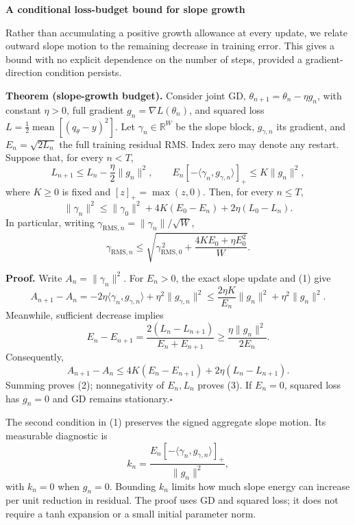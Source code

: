 \documentclass[10pt,letterpaper]{article}
\begin{document}
\fontsize{9.5}{10.6}\selectfont
{\large\bfseries A conditional loss-budget bound for slope growth\par}
\vspace{4pt}
Rather than accumulating a positive growth allowance at every update, we relate outward slope motion to the remaining decrease in training error. This gives a bound with no explicit dependence on the number of steps, provided a gradient-direction condition persists.

\textbf{Theorem (slope-growth budget).}
Consider joint GD, $\theta_{n+1}=\theta_n-\eta g_n$, with constant $\eta>0$, full gradient $g_n=\nabla L(\theta_n)$, and squared loss $L=\tfrac12\operatorname{mean}[(q_\theta-y)^2]$. Let $\gamma_n\in\mathbb R^W$ be the slope block, $g_{\gamma,n}$ its gradient, and $E_n=\sqrt{2L_n}$ the full training residual RMS. Index zero may denote any restart. Suppose that, for every $n<T$,
\begin{equation}
L_{n+1}\le L_n-\frac{\eta}{2}\|g_n\|^2,
\qquad
E_n[-\langle\gamma_n,g_{\gamma,n}\rangle]_+
\le K\|g_n\|^2,
\end{equation}
where $K\ge0$ is fixed and $[z]_+=\max(z,0)$. Then, for every $n\le T$,
\begin{equation}
\|\gamma_n\|^2
\le\|\gamma_0\|^2+4K(E_0-E_n)+2\eta(L_0-L_n).
\end{equation}
In particular, writing $\gamma_{\mathrm{RMS},n}=\|\gamma_n\|/\sqrt W$,
\begin{equation}
\boxed{
\gamma_{\mathrm{RMS},n}
\le\sqrt{\gamma_{\mathrm{RMS},0}^{\,2}+
\frac{4KE_0+\eta E_0^2}{W}}.
}
\end{equation}

\textbf{Proof.}
Write $A_n=\|\gamma_n\|^2$. For $E_n>0$, the exact slope update and (1) give
\[
A_{n+1}-A_n
=-2\eta\langle\gamma_n,g_{\gamma,n}\rangle
+\eta^2\|g_{\gamma,n}\|^2
\le\frac{2\eta K}{E_n}\|g_n\|^2+\eta^2\|g_n\|^2.
\]
Meanwhile, sufficient decrease implies
\[
E_n-E_{n+1}
=\frac{2(L_n-L_{n+1})}{E_n+E_{n+1}}
\ge\frac{\eta\|g_n\|^2}{2E_n}.
\]
Consequently,
\[
A_{n+1}-A_n
\le4K(E_n-E_{n+1})+2\eta(L_n-L_{n+1}).
\]
Summing proves (2); nonnegativity of $E_n,L_n$ proves (3). If $E_n=0$, squared loss has $g_n=0$ and GD remains stationary.\nobreak\hfill$\square$

The second condition in (1) preserves the signed aggregate slope motion. Its measurable diagnostic is
\[
k_n=\frac{E_n[-\langle\gamma_n,g_{\gamma,n}\rangle]_+}{\|g_n\|^2},
\]
with $k_n=0$ when $g_n=0$. Bounding $k_n$ limits how much slope energy can increase per unit reduction in residual. The proof uses GD and squared loss; it does not require a tanh expansion or a small initial parameter norm.
\end{document}

